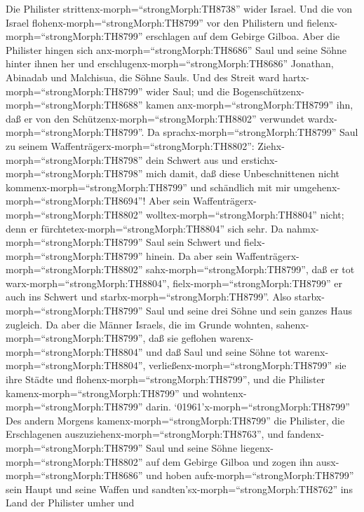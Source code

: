  Die Philister strittenx-morph=``strongMorph:TH8738'' wider
Israel. Und die von Israel flohenx-morph=``strongMorph:TH8799'' vor den
Philistern und fielenx-morph=``strongMorph:TH8799'' erschlagen auf dem
Gebirge Gilboa.  Aber die Philister hingen sich
anx-morph=``strongMorph:TH8686'' Saul und seine Söhne hinter ihnen her
und erschlugenx-morph=``strongMorph:TH8686'' Jonathan, Abinadab und
Malchisua, die Söhne Sauls.  Und des Streit ward
hartx-morph=``strongMorph:TH8799'' wider Saul; und die
Bogenschützenx-morph=``strongMorph:TH8688'' kamen
anx-morph=``strongMorph:TH8799'' ihn, daß er von den
Schützenx-morph=``strongMorph:TH8802'' verwundet
wardx-morph=``strongMorph:TH8799''.  Da
sprachx-morph=``strongMorph:TH8799'' Saul zu seinem
Waffenträgerx-morph=``strongMorph:TH8802'':
Ziehx-morph=``strongMorph:TH8798'' dein Schwert aus und
erstichx-morph=``strongMorph:TH8798'' mich damit, daß diese
Unbeschnittenen nicht kommenx-morph=``strongMorph:TH8799'' und
schändlich mit mir umgehenx-morph=``strongMorph:TH8694''! Aber sein
Waffenträgerx-morph=``strongMorph:TH8802''
wolltex-morph=``strongMorph:TH8804'' nicht; denn er
fürchtetex-morph=``strongMorph:TH8804'' sich sehr. Da
nahmx-morph=``strongMorph:TH8799'' Saul sein Schwert und
fielx-morph=``strongMorph:TH8799'' hinein.  Da aber sein
Waffenträgerx-morph=``strongMorph:TH8802''
sahx-morph=``strongMorph:TH8799'', daß er tot
warx-morph=``strongMorph:TH8804'', fielx-morph=``strongMorph:TH8799'' er
auch ins Schwert und starbx-morph=``strongMorph:TH8799''. 
Also starbx-morph=``strongMorph:TH8799'' Saul und seine drei Söhne und
sein ganzes Haus zugleich.  Da aber die Männer Israels, die
im Grunde wohnten, sahenx-morph=``strongMorph:TH8799'', daß sie geflohen
warenx-morph=``strongMorph:TH8804'' und daß Saul und seine Söhne tot
warenx-morph=``strongMorph:TH8804'',
verließenx-morph=``strongMorph:TH8799'' sie ihre Städte und
flohenx-morph=``strongMorph:TH8799'', und die Philister
kamenx-morph=``strongMorph:TH8799'' und
wohntenx-morph=``strongMorph:TH8799'' darin. 
`01961'\textbar x-morph=``strongMorph:TH8799'' Des andern Morgens
kamenx-morph=``strongMorph:TH8799'' die Philister, die Erschlagenen
auszuziehenx-morph=``strongMorph:TH8763'', und
fandenx-morph=``strongMorph:TH8799'' Saul und seine Söhne
liegenx-morph=``strongMorph:TH8802'' auf dem Gebirge Gilboa 
und zogen ihn ausx-morph=``strongMorph:TH8686'' und hoben
aufx-morph=``strongMorph:TH8799'' sein Haupt und seine Waffen und
sandten'sx-morph=``strongMorph:TH8762'' ins Land der Philister umher und
